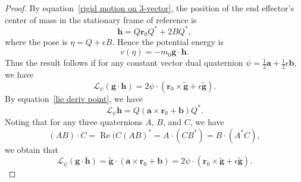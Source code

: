 \documentclass[reqno,12pt]{amsart}
\DeclareMathOperator\realpart{Re}
\newcommand{\liederiv}{\mathcal L}
\begin{document}
\begin{proof}  By equation~\eqref{rigid motion on 3-vector}, the position of the end effector's center of mass in the stationary frame of reference is
\begin{equation}
\bm h = Q \bm r_0 Q^* + 2 B Q^*,
\end{equation}
where the pose is $\eta = Q + \epsilon B$.  Hence the potential energy is
\begin{equation}
v (\eta) = - m_0 \bm g \cdot \bm h .
\end{equation}
Thus the result follows if for any constant vector dual quaternion $\psi = \tfrac12\bm a + \tfrac12 \epsilon \bm b$, we have
\begin{equation}
\liederiv_\psi (\bm g \cdot \bm h)
= 2 \psi \cdot (\bm r_0 \times \tilde{\bm g} + \epsilon \tilde{\bm g}) .
\end{equation}
By equation~\eqref{lie deriv point}, we have
\begin{equation}
\liederiv_\psi \bm h = Q(\bm a \times \bm r_0 + \bm b) Q^* .
\end{equation}
Noting that for any three quaternions $A$, $B$, and $C$, we have
\begin{equation}
(AB)\cdot C = \realpart(C (AB)^*= A \cdot (C B^*) = B \cdot (A^* C),
\end{equation}
we obtain that
\begin{equation}
\liederiv_\psi (\bm g \cdot \bm h) = \tilde{\bm g} \cdot (\bm a \times \bm r_0 + \bm b) = 2 \psi \cdot (\bm r_0 \times \tilde{\bm g} + \epsilon \tilde{\bm g}) .
\end{equation}
\end{proof}
\end{document}
